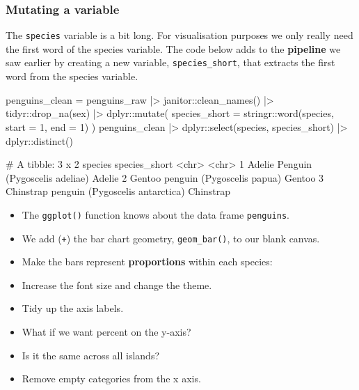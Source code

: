 \documentclass[a4paper]{article}\usepackage[]{graphicx}\usepackage[]{xcolor}
\begin{document}
\subsubsection{Mutating a variable}
The \lstinline|species| variable is a bit long. For visualisation purposes we only really need the first word of the species variable. The code below adds to the \textbf{pipeline} we saw earlier by creating a new variable, \lstinline|species_short|, that extracts the first word from the species variable.
\begin{Schunk}
\begin{Sinput}
penguins_clean = penguins_raw |>
  janitor::clean_names() |>
  tidyr::drop_na(sex) |>
  dplyr::mutate(
  species_short = stringr::word(species, start = 1, end = 1)
  )
penguins_clean |>
  dplyr::select(species, species_short) |>
  dplyr::distinct()
\end{Sinput}
\begin{Soutput}
# A tibble: 3 x 2
  species                                   species_short
  <chr>                                     <chr>        
1 Adelie Penguin (Pygoscelis adeliae)       Adelie       
2 Gentoo penguin (Pygoscelis papua)         Gentoo       
3 Chinstrap penguin (Pygoscelis antarctica) Chinstrap    
\end{Soutput}
\end{Schunk}
\begin{itemize}
	\item The \lstinline|ggplot()| function knows about the data frame \lstinline|penguins|.
	\item We add (\lstinline|+|) the bar chart geometry, \lstinline|geom_bar()|, to our blank canvas.
	\item Make the bars represent \textbf{proportions} within each species:
	\item Increase the font size and change the theme.
	\item Tidy up the axis labels.
	\item What if we want percent on the y-axis?
	\item Is it the same across all islands?
	\item Remove empty categories from the x axis.
\end{itemize}
\end{document}
